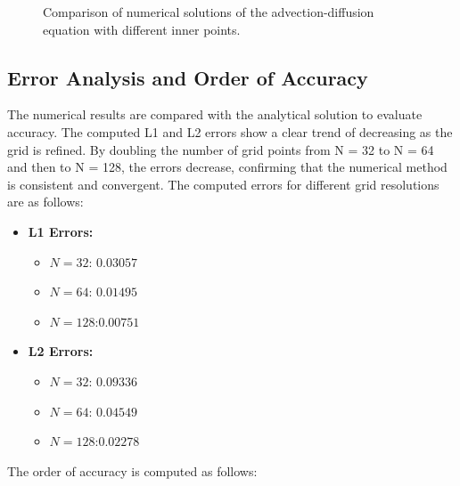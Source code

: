 \documentclass{article}
\begin{document}
\begin{figure}[h!]
\begin{minipage}{0.32\textwidth}
      \label{fig:128}
  \end{minipage}
  \caption{Comparison of numerical solutions of the advection-diffusion equation with different inner points.}
  \label{fig:comparison}
\end{figure}

\subsection{Error Analysis and Order of Accuracy}

The numerical results are compared with the analytical solution to evaluate accuracy. The computed L1 and L2 errors show a clear trend of 
decreasing as the grid is refined. By doubling the number of grid points from N = 32 to N = 64 and then to N = 128, the errors decrease, 
confirming that the numerical method is consistent and convergent. The computed errors for different grid resolutions are as follows:

\begin{itemize}
    \item \textbf{L1 Errors:}
    \begin{itemize}
        \item $N = 32$: \quad $0.03057$
        \item $N = 64$: \quad $0.01495$
        \item $N = 128$:\quad $0.00751$
    \end{itemize}
    
    \item \textbf{L2 Errors:}
    \begin{itemize}
        \item $N = 32$: \quad $0.09336$
        \item $N = 64$: \quad $0.04549$
        \item $N = 128$:\quad $0.02278$
    \end{itemize}
\end{itemize}
The order of accuracy is computed as follows:
\end{document}
